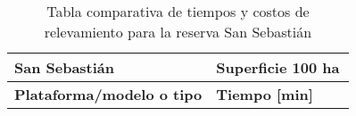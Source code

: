 \begin{table}[]
    \begin{threeparttable}[b]
        \centering
        \caption{Tabla comparativa de tiempos y costos de relevamiento para la reserva San Sebastián}
        \label{tab:sanse}
        \begin{tabular}{llclc}
            \hline
            \hline
            \multicolumn{2}{l}{\textbf{San Sebastián}}                                                                            & \multicolumn{3}{l}{\textbf{Superficie   100 ha}} \\ \hline
            \multicolumn{2}{l}{\cellcolor[HTML]{FFFFFF}\textbf{Plataforma/modelo o tipo}} &
              \multicolumn{1}{l}{\textbf{Tiempo {[}min{]}}} &
              

\end{tabular}
\end{threeparttable}
\end{table}
